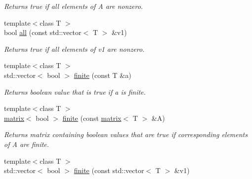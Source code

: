 \begin{DoxyCompactItemize}
\begin{DoxyCompactList}\small\item\em Returns true if all elements of A are nonzero. \end{DoxyCompactList}\item 
\hypertarget{namespacekeycpp_adcb91abe9a1d64046037bced47b7b466}{{\footnotesize template$<$class T $>$ }\\bool \hyperlink{namespacekeycpp_adcb91abe9a1d64046037bced47b7b466}{all} (const std\-::vector$<$ T $>$ \&v1)}\label{namespacekeycpp_adcb91abe9a1d64046037bced47b7b466}

\begin{DoxyCompactList}\small\item\em Returns true if all elements of v1 are nonzero. \end{DoxyCompactList}\item 
\hypertarget{namespacekeycpp_a03069647e77ae29e5437553b98274634}{{\footnotesize template$<$class T $>$ }\\std\-::vector$<$ bool $>$ \hyperlink{namespacekeycpp_a03069647e77ae29e5437553b98274634}{finite} (const T \&a)}\label{namespacekeycpp_a03069647e77ae29e5437553b98274634}

\begin{DoxyCompactList}\small\item\em Returns boolean value that is true if a is finite. \end{DoxyCompactList}\item 
\hypertarget{namespacekeycpp_a8879482fc9af1a809453e1719948263b}{{\footnotesize template$<$class T $>$ }\\\hyperlink{classkeycpp_1_1matrix}{matrix}$<$ bool $>$ \hyperlink{namespacekeycpp_a8879482fc9af1a809453e1719948263b}{finite} (const \hyperlink{classkeycpp_1_1matrix}{matrix}$<$ T $>$ \&A)}\label{namespacekeycpp_a8879482fc9af1a809453e1719948263b}

\begin{DoxyCompactList}\small\item\em Returns matrix containing boolean values that are true if corresponding elements of A are finite. \end{DoxyCompactList}\item 
\hypertarget{namespacekeycpp_af4add0d0b269850e5f5fc1362d023666}{{\footnotesize template$<$class T $>$ }\\std\-::vector$<$ bool $>$ \hyperlink{namespacekeycpp_af4add0d0b269850e5f5fc1362d023666}{finite} (const std\-::vector$<$ T $>$ \&v1)}\label{namespacekeycpp_af4add0d0b269850e5f5fc1362d023666}


\end{DoxyCompactItemize}
